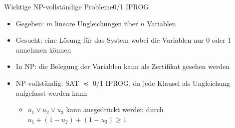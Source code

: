 \documentclass[ignorenonframetext,]{beamer}
\begin{document}
\begin{frame}{Wichtige NP-vollständige Probleme}{0/1 IPROG}

\begin{itemize}
\itemsep1pt\parskip0pt
\item
  Gegeben: $m$ lineare Ungleichungen über $n$ Variablen
\item
  Gesucht: eine Lösung für das System wobei die Variablen nur 0 oder 1
  annehmen können
\item
  In NP: die Belegung der Variablen kann als Zertifikat gesehen werden
\item
  NP-vollständig: SAT $\preceq$ 0/1 IPROG, da jede Klausel als
  Ungleichung aufgefasst werden kann

  \begin{itemize}
  \itemsep1pt\parskip0pt
  \item
    $u_1 \vee \overline{u_2} \vee \overline{u_3}$ kann ausgedrückt
    werden durch $u_1 + (1 - u_2) + (1 - u_3) \geq 1$
  \end{itemize}
\end{itemize}
\end{frame}
\end{document}
